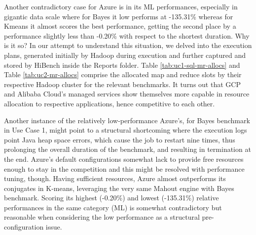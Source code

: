 \documentclass[review]{elsarticle}
\begin{document}
	Another contradictory case for Azure is in its ML performances, especially in gigantic data scale where for Bayes it low performs at -135.31\% whereas for Kmeans it almost scores the best performance, getting the second place by a performance slightly less than -0.20\% with respect to the shortest duration. Why is it so? In our attempt to understand this situation, we delved into the execution plans, generated initially by Hadoop during execution and further captured and stored by HiBench inside the Reports folder. Table \ref{tab:uc1-sql-mr-allocs} and Table \ref{tab:uc2-mr-allocs} comprise the allocated map and reduce slots by their respective Hadoop cluster for the relevant benchmarks. It turns out that GCP and Alibaba Cloud's managed services show themselves more capable in resource allocation to respective applications, hence competitive to each other. 
	
	Another instance of the relatively low-performance Azure's, for Bayes benchmark in Use Case 1, might point to a structural shortcoming where the execution logs point Java heap space errors, which cause the job to restart nine times, thus prolonging the overall duration of the benchmark, and resulting in termination at the end. Azure's default configurations somewhat lack to provide free resources enough to stay in the competition and this might be resolved with performance tuning, though. Having sufficient resources, Azure almost outperforms its conjugates in K-means, leveraging the very same Mahout engine with Bayes benchmark. Scoring its highest (-0.20\%) and lowest (-135.31\%) relative performances in the same category (ML) is somewhat contradictory but reasonable when considering the low performance as a structural pre-configuration issue.
	
\end{document}
